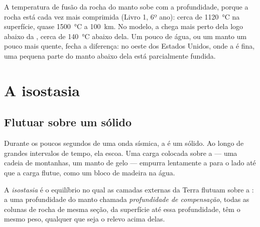 A temperatura de fusão da rocha do manto sobe com a profundidade, porque a
rocha está cada vez mais comprimida (Livro 1, 6º ano): cerca de
\qty{1120}{\celsius} na superfície, quase \qty{1500}{\celsius} a
\qty{100}{km}. No modelo, a  chega mais perto dela logo abaixo da
, cerca de \qty{140}{\celsius} abaixo dela. Um pouco de água, ou um
manto um pouco mais quente, fecha a diferença: no oeste dos Estados Unidos,
onde a  é fina, uma pequena parte do manto abaixo dela está
parcialmente fundida.

\section{A isostasia}

\subsection{Flutuar sobre um sólido}

Durante os poucos segundos de uma onda sísmica, a  é um sólido.
Ao longo de grandes intervalos de tempo, ela escoa. Uma carga colocada sobre
a  --- uma cadeia de montanhas, um manto de gelo --- empurra
lentamente a  para o lado até que a carga flutue, como um bloco
de madeira na água.

\begin{definition}\label{def:g11:lithosphere-asthenosphere:isostasy}
A \emph{isostasia} é o equilíbrio no qual as camadas
externas da Terra flutuam sobre a : a uma profundidade do manto
chamada \emph{profundidade de compensação}, todas as colunas de
rocha de mesma seção, da superfície até essa profundidade, têm o mesmo peso,
qualquer que seja o relevo acima delas.
\end{definition}

